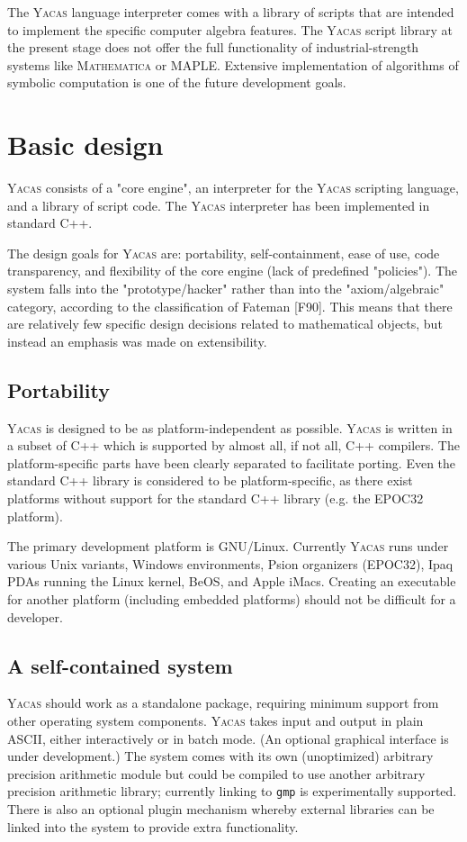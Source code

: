 \documentclass{llncs}
\begin{document}
The \textsc{Yacas} language interpreter comes with a library of scripts that are
intended to implement the specific computer algebra features. The \textsc{Yacas} script library
at the present stage does not offer the full functionality of
industrial-strength systems like \textsc{Mathematica} or \textsc{MAPLE}. Extensive
implementation of algorithms of symbolic computation is one of the future
development goals.


\section{Basic design}
\textsc{Yacas} consists of a "core engine", an interpreter for the \textsc{Yacas} scripting
language, and a library of script code. The \textsc{Yacas} interpreter has been
implemented in standard C++.


The design goals for \textsc{Yacas} are: portability, self-containment, ease of use,
code transparency, and flexibility of the core engine (lack of predefined "policies"). The system falls into the "prototype/hacker" rather than into the "axiom/algebraic" category, according to the classification of Fateman [F90]. This means that there are relatively few specific design decisions related to mathematical objects, but instead an emphasis was made on extensibility.


\subsection*{Portability}
\textsc{Yacas} is designed to be as platform-independent as possible. \textsc{Yacas} is written
in a subset of C++ which is supported by almost all, if not all, C++ compilers.
The platform-specific parts have been clearly separated to facilitate porting.
Even the standard C++ library is considered to be platform-specific, as there
exist  platforms without support for the standard C++ library (e.g. the
EPOC32 platform).


The primary development platform is GNU/Linux. Currently \textsc{Yacas} runs under
various Unix variants, Windows environments, Psion organizers (EPOC32),
Ipaq PDAs running the Linux kernel,
BeOS, and Apple iMacs. Creating an executable for another platform (including embedded platforms)
should not be difficult for a developer.


\subsection*{A self-contained system}
\textsc{Yacas} should work as a standalone package, requiring minimum support from other
operating system components. \textsc{Yacas} takes input and output in plain ASCII,
either interactively or in batch mode. (An optional graphical interface is under development.) The system comes with its own
(unoptimized) arbitrary precision arithmetic module but could be compiled to
use another arbitrary precision arithmetic library; currently linking to \texttt{gmp}
is experimentally supported. There is also an optional plugin mechanism
whereby external libraries can be linked into the system to provide extra
functionality.
\end{document}

